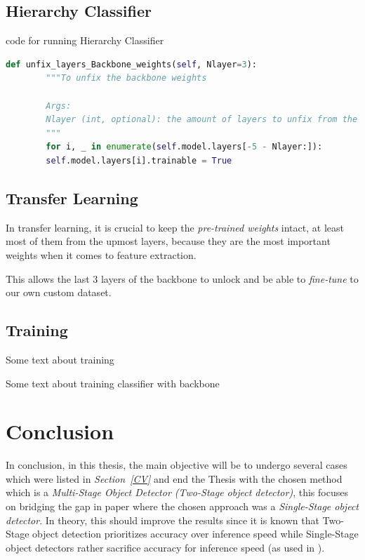 \documentclass[12pt]{extarticle}
\begin{document}
	\subsection{Hierarchy Classifier}
	
	code for running Hierarchy Classifier
	
	\begin{lstlisting}[language=Python, caption=Backbone layer unlocking function, label=unlock]
		def unfix_layers_Backbone_weights(self, Nlayer=3):
		"""To unfix the backbone weights
		
		Args:
		Nlayer (int, optional): the amount of layers to unfix from the end. Defaults to 3.
		"""
		for i, _ in enumerate(self.model.layers[-5 - Nlayer:]):
		self.model.layers[i].trainable = True
	\end{lstlisting}

	\subsection{Transfer Learning}
	In transfer learning, it is crucial to keep the \emph{pre-trained weights} intact, at least most of them from the upmost layers, because they are the most important weights when it comes to feature extraction. 
	
	
	
	This allows the last 3 layers of the backbone to unlock and be able to \emph{fine-tune} to our own custom dataset.
	
	\subsection{Training}
	Some text about training 
	
	Some text about training classifier with backbone
	
	

	\newpage
	
	\section{Conclusion}
	In conclusion, in this thesis, the main objective will be to undergo several cases which were listed in \emph{Section~\ref{CV}} and end the Thesis with the chosen method which is a \emph{Multi-Stage Object Detector (Two-Stage object detector)}, this focuses on bridging the gap in paper \cite{one_shot} where the chosen approach was a \emph{Single-Stage object detector}. In theory, this should improve the results since it is known that Two-Stage object detection prioritizes accuracy over inference speed while Single-Stage object detectors rather sacrifice accuracy for inference speed (as used in \cite{one_shot}). 
	\newpage

	
	
	
	
\end{document}
